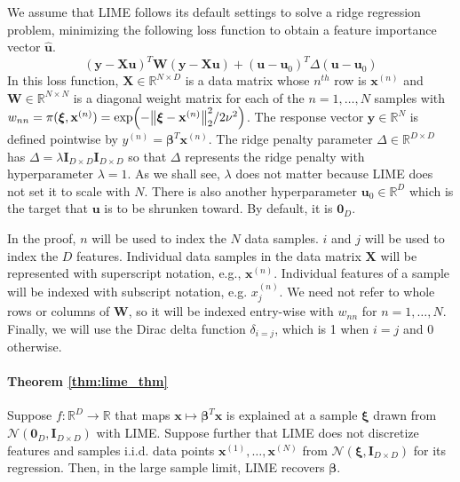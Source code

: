 \documentclass[12pt]{article}  %
\newcommand{\bu}{\mathbf{u}}
\newcommand{\bI}{\mathbf{I}}
\begin{document}
        We assume that LIME follows its default settings to solve a ridge regression problem, minimizing the following loss function to obtain a feature importance vector $\hat{\bu}$. 
        \begin{equation*}
            (\mathbf{y} - \mathbf{X}\mathbf{u})^T \mathbf{W}(\mathbf{y} - \mathbf{X}\mathbf{u}) + (\mathbf{u} - \mathbf{u}_0)^T \Delta(\mathbf{u} - \mathbf{u}_0)
        \end{equation*}
        In this loss function, $\mathbf{X} \in \mathbb{R}^{N\times D}$ is a data matrix  whose $n^{th}$ row is $\mathbf{x}^{(n)}$ and $\mathbf{W} \in \mathbb{R}^{N\times N}$ is a diagonal weight matrix for each of the $n=1,\ldots,N$ samples with $w_{nn} = \pi(\boldsymbol{\xi},\mathbf{x}^{(n)}) = \exp(-\norm{\boldsymbol{\xi} - \mathbf{x}^{(n)}}_2^2/2\nu^2)$. The response vector $\mathbf{y}\in \mathbb{R}^N$ is defined pointwise by $y^{(n)} = \boldsymbol{\beta}^T \mathbf{x}^{(n)}$. The ridge penalty parameter $\Delta\in \mathbb{R}^{D\times D}$ has $\Delta = \lambda \bI_{D\times D} \bI_{D\times D}$ so that $\Delta$ represents the ridge penalty with hyperparameter $\lambda=1$. As we shall see, $\lambda$ does not matter because LIME does not set it to scale with $N$. There is also another hyperparameter $\mathbf{u}_0 \in \mathbb{R}^D$ which is the target that $\mathbf{u}$ is to be shrunken toward. By default, it is $\mathbf{0}_D$. 

        In the proof, $n$ will be used to index the $N$ data samples. $i$ and $j$ will be used to index the $D$ features. Individual data samples in the data matrix $\mathbf{X}$ will be represented with superscript notation, e.g., $\mathbf{x}^{(n)}$. Individual features of a sample will be indexed with subscript notation, e.g. $x^{(n)}_j$. We need not refer to whole rows or columns of $\mathbf{W}$, so it will be indexed entry-wise with $w_{nn}$ for $n=1,\ldots,N$. Finally, we will use the Dirac delta function $\delta_{i=j}$, which is 1 when $i=j$ and 0 otherwise. 

            \paragraph{\textbf{Theorem \ref{thm:lime_thm}}}
                Suppose $f:\mathbb{R}^D\rightarrow \mathbb{R}$ that maps $\mathbf{x} \mapsto \boldsymbol{\beta}^T \mathbf{x}$ is explained at a sample $\boldsymbol{\xi}$ drawn from $\mathcal{N}(\mathbf{0}_D, \bI_{D\times D})$ with LIME. Suppose further that LIME does not discretize features and samples i.i.d. data points $\mathbf{x}^{(1)},\ldots,\mathbf{x}^{(N)}$ from $ \mathcal{N}(\boldsymbol{\xi}, \bI_{D\times D})$ for its regression.
                 Then, in the large sample limit, LIME recovers $\boldsymbol{\beta}$.   
\end{document}
